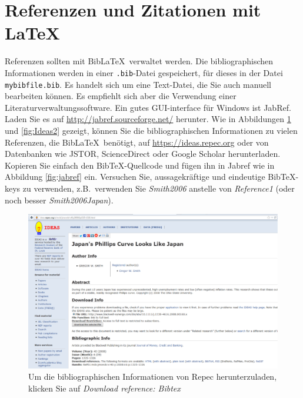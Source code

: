 \documentclass[a4paper,12pt]{scrartcl} %
\begin{document}
\section{Referenzen und Zitationen mit \LaTeX}
Referenzen sollten mit Bib\LaTeX\ verwaltet werden. Die bibliographischen Informationen werden in einer \texttt{.bib}-Datei gespeichert, für dieses in der Datei \texttt{mybibfile.bib}. Es handelt sich um eine Text-Datei, die Sie auch manuell bearbeiten können. Es empfiehlt sich aber die Verwendung einer Literaturverwaltungssoftware. Ein gutes GUI-interface für Windows ist JabRef. Laden Sie es auf \url{http://jabref.sourceforge.net/} herunter. Wie in Abbildungen \ref{fig:Ideas1} und \ref{fig:Ideas2} gezeigt, können Sie die bibliographischen Informationen zu vielen Referenzen, die Bib\LaTeX\ benötigt, auf \url{https://ideas.repec.org} oder von Datenbanken wie JSTOR, ScienceDirect oder Google Scholar herunterladen. Kopieren Sie einfach den Bib\TeX-Quellcode und fügen ihn in Jabref wie in Abbildung \ref{fig:jabref} ein. Versuchen Sie, aussagekräftige und eindeutige Bib\TeX-keys zu verwenden, z.B.\ verwenden Sie \textit{Smith2006} anstelle von \textit{Reference1} (oder noch besser \textit{Smith2006Japan}).

\begin{figure}[h!] %
\includegraphics[scale=0.3]{Ideas}  %
\caption[Titel für Abbildungsverzeichnis]{Um die bibliographischen Informationen von Repec herunterzuladen, klicken Sie auf \emph{Download reference: Bibtex}}\label{fig:Ideas1} %
\end{figure}
\end{document}
